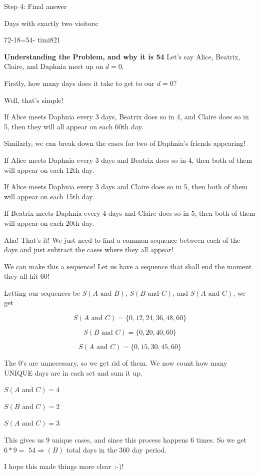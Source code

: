 \begin{enumerate}
 Step 4: Final answer

 Days with exactly two visitors:

 72-18=54- timi821

 \textbf{Understanding the Problem, and why it is 54} Let's say Alice, Beatrix, Claire, and Daphnia meet up on \( d=0 \).

 Firstly, how many days does it take to get to our \( d=0 \)?

 Well, that's simple!

 If Alice meets Daphnia every 3 days, Beatrix does so in 4, and Claire does so in 5, then they will all appear on each 60th day.

 Similarly, we can break down the cases for two of Daphnia's friends appearing!

 If Alice meets Daphnia every 3 days and Beatrix does so in 4, then both of them will appear on each 12th day.

 If Alice meets Daphnia every 3 days and Claire does so in 5, then both of them will appear on each 15th day.

 If Beatrix meets Daphnia every 4 days and Claire does so in 5, then both of them will appear on each 20th day.

 Aha! That's it! We just need to find a common sequence between each of the days and just subtract the cases where they all appear!

 We can make this a sequence! Let us have a sequence that shall end the moment they all hit 60!

 Letting our sequences be \( S(A \text{ and } B) \), \( S (B \text{ and } C) \), and \( S(A \text{ and } C) \), we get

 
 \[S(A \text{ and } C) = \{0, 12, 24, 36, 48, 60\}\]

 \[S(B \text{ and } C) = \{0, 20, 40, 60\}\]

 \[S(A \text{ and } C) = \{0, 15, 30, 45, 60\}\]

 The 0's are unnecessary, so we get rid of them. We now count how many UNIQUE days are in each set and sum it up.

 \( S(A \text{ and } C) = 4 \)

 \( S(B \text{ and } C) = 2 \)

 \( S(A \text{ and } C) = 3 \)

 This gives us 9 unique cases, and since this process happens 6 times. So we get \( 6*9=\) $\boxed{54 \Rightarrow (B)}$ total days in the 360 day period. 

 I hope this made things more clear :-)!


\end{enumerate}

